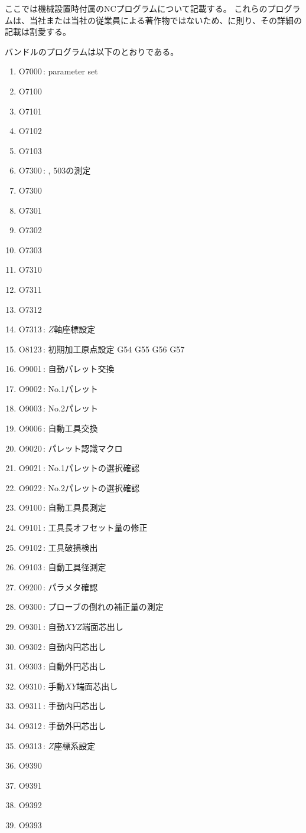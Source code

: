 \setcounter{lstlisting}{0}

ここでは機械設置時付属のNCプログラムについて記載する。
これらのプログラムは、当社または当社の従業員による著作物ではないため、に則り、その詳細の記載は割愛する。


バンドルのプログラムは以下のとおりである。
\begin{enumerate}
\item O7000\,: parameter set
\item O7100
\item O7101
\item O7102
\item O7103
\item O7300\,: , \ttNum503の測定
\item O7300
\item O7301
\item O7302
\item O7303
\item O7310
\item O7311
\item O7312
\item O7313\,: \texorpdfstring{$Z$}{Z}軸座標設定
\item O8123\,: 初期加工原点設定 G54 G55 G56 G57
\item O9001\,: 自動パレット交換
\item O9002\,: No.1パレット
\item O9003\,: No.2パレット
\item O9006\,: 自動工具交換
\item O9020\,: パレット認識マクロ
\item O9021\,: No.1パレットの選択確認
\item O9022\,: No.2パレットの選択確認
\item O9100\,: 自動工具長測定
\item O9101\,: 工具長オフセット量の修正
\item O9102\,: 工具破損検出
\item O9103\,: 自動工具径測定
\item O9200\,: パラメタ確認
\item O9300\,: プローブの倒れの補正量の測定
\item O9301\,: 自動\texorpdfstring{$XYZ$}{XYZ}端面芯出し
\item O9302\,: 自動内円芯出し
\item O9303\,: 自動外円芯出し
\item O9310\,: 手動\texorpdfstring{$XY$}{XY}端面芯出し
\item O9311\,: 手動内円芯出し
\item O9312\,: 手動外円芯出し
\item O9313\,: \texorpdfstring{$Z$}{Z}座標系設定
\item O9390
\item O9391
\item O9392
\item O9393
\end{enumerate}
